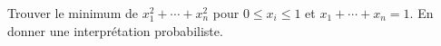 Trouver le minimum de $x_1^2 + \cdots + x_n^2$ pour $0 \leq x_i \leq 1$ et $x_1 + \cdots + x_n = 1$. En donner une interprétation probabiliste.
